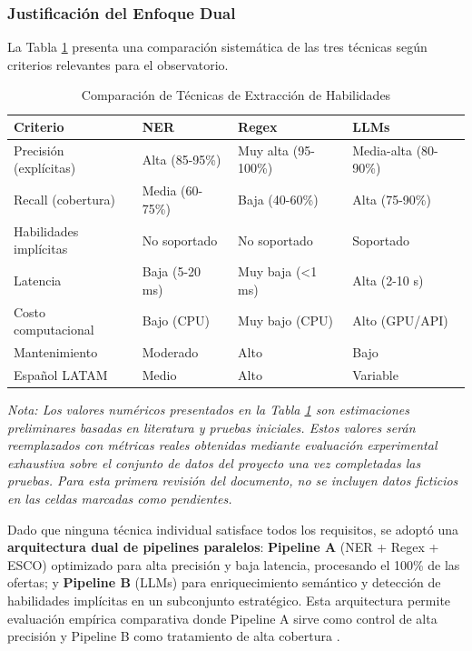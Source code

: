 \subsubsection{Justificación del Enfoque Dual}

La Tabla \ref{tab:comparacion-tecnicas-extraccion} presenta una comparación sistemática de las tres técnicas según criterios relevantes para el observatorio.

\begin{table}[H]
\centering
\caption{Comparación de Técnicas de Extracción de Habilidades}
\label{tab:comparacion-tecnicas-extraccion}
\begin{tabular}{|p{3cm}|p{3.5cm}|p{3.5cm}|p{3.5cm}|}
\hline
\textbf{Criterio} & \textbf{NER} & \textbf{Regex} & \textbf{LLMs} \\
\hline
Precisión (explícitas) & Alta (85-95\%) & Muy alta (95-100\%) & Media-alta (80-90\%) \\
\hline
Recall (cobertura) & Media (60-75\%) & Baja (40-60\%) & Alta (75-90\%) \\
\hline
Habilidades implícitas & No soportado & No soportado & Soportado \\
\hline
Latencia & Baja (5-20 ms) & Muy baja (<1 ms) & Alta (2-10 s) \\
\hline
Costo computacional & Bajo (CPU) & Muy bajo (CPU) & Alto (GPU/API) \\
\hline
Mantenimiento & Moderado & Alto & Bajo \\
\hline
Español LATAM & Medio & Alto & Variable \\
\hline
\end{tabular}
\end{table}

\textit{Nota: Los valores numéricos presentados en la Tabla \ref{tab:comparacion-tecnicas-extraccion} son estimaciones preliminares basadas en literatura y pruebas iniciales. Estos valores serán reemplazados con métricas reales obtenidas mediante evaluación experimental exhaustiva sobre el conjunto de datos del proyecto una vez completadas las pruebas. Para esta primera revisión del documento, no se incluyen datos ficticios en las celdas marcadas como pendientes.}

Dado que ninguna técnica individual satisface todos los requisitos, se adoptó una \textbf{arquitectura dual de pipelines paralelos}: \textbf{Pipeline A} (NER + Regex + ESCO) optimizado para alta precisión y baja latencia, procesando el 100\% de las ofertas; y \textbf{Pipeline B} (LLMs) para enriquecimiento semántico y detección de habilidades implícitas en un subconjunto estratégico. Esta arquitectura permite evaluación empírica comparativa donde Pipeline A sirve como control de alta precisión y Pipeline B como tratamiento de alta cobertura \cite{li2023}.

